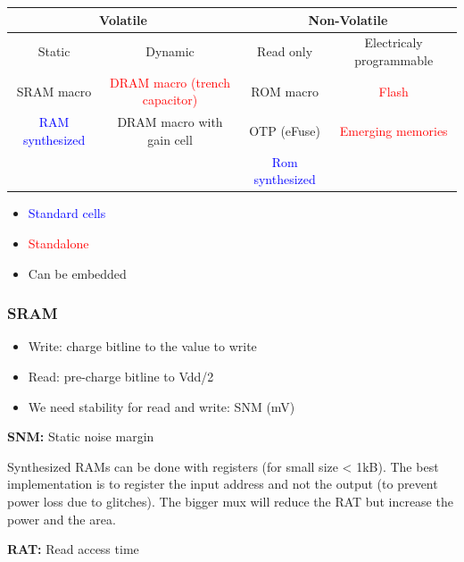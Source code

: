 \begin{center}
  \begin{tabular}{|c|c|c|c|}
    \hline
    \multicolumn{2}{|c|}{Volatile}&\multicolumn{2}{c|}{Non-Volatile}\\
    \hline
    Static&Dynamic&Read only&Electricaly programmable\\
    \hline
    \hline
    SRAM macro& \textcolor{red}{DRAM macro (trench capacitor)}&ROM macro& \textcolor{red}{Flash}\\
    \hline
  \textcolor{blue}{RAM synthesized}&DRAM macro with gain cell&OTP (eFuse)&\textcolor{red}{Emerging memories}\\
    \hline
&&\textcolor{blue}{Rom synthesized}&\\
    \hline
  \end{tabular}
\end{center}
\begin{itemize}
  \item \textcolor{blue}{Standard cells}
  \item \textcolor{red}{Standalone}
  \item Can be embedded
\end{itemize}

\subsubsection{SRAM}
\begin{itemize}
  \item Write: charge bitline to the value to write
  \item Read: pre-charge bitline to Vdd/2
  \item We need stability for read and write: SNM (mV)
\end{itemize}

\textbf{SNM:} Static noise margin


Synthesized RAMs can be done with registers (for small size < 1kB). The best implementation is to register the input address and not the output (to prevent power loss due to glitches).
\bigbreak
The bigger mux will reduce the RAT but increase the power and the area.

\textbf{RAT:} Read access time



